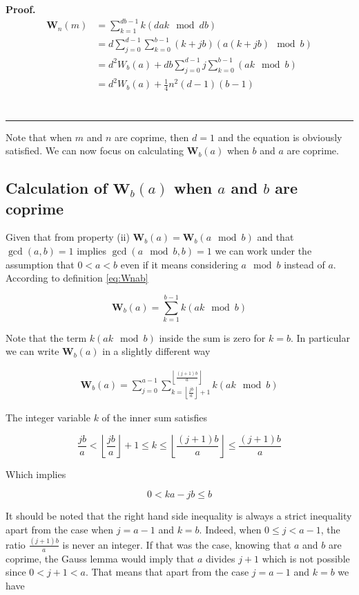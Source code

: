 \documentclass{article}%
\newenvironment{proof}[1][Proof]{\textbf{#1.} }{\ \rule{0.5em}{0.5em}}
\newcommand{\ENT}[1]{ \left\lfloor #1 \right\rfloor}
\newcommand{\Efrac}[2]{\ENT{\frac{#1}{#2}}}
\newcommand{\SUMW}[2]{\mathbf{W}_{#1}\left(#2\right)}
\begin{document}
\begin{proof}
\begin{align*}
\SUMW{n}{m}
&= \sum_{k=1}^{db-1}k(dak \mod db) \\
&= d \sum_{j=0}^{d-1} \sum_{k=0}^{b-1}(k+jb)(a(k+jb) \mod b) \\
&= d^2 W_{b}(a) + db \sum_{j=0}^{d-1} j\sum_{k=0}^{b-1}(ak \mod b) \\
&= d^2 W_{b}(a) + \frac{1}{4}n^2(d-1)(b-1) \\
\end{align*}
\end{proof}

Note that when $m$ and $n$ are coprime, then $d=1$ and the equation is obviously satisfied. We can now focus on calculating $\SUMW{b}{a}$ when $b$ and $a$ are coprime.

\subsection{Calculation of $\SUMW{b}{a}$ when $a$ and $b$ are coprime}

Given that from property (ii) $\SUMW{b}{a}=\SUMW{b}{a\mod b}$ and that $\gcd(a,b)=1$ implies $\gcd(a\mod b,b)=1$ we can work under the assumption that $0<a<b$ even if it means considering $a\mod b$ instead of $a$. According to definition \ref{eq:Wnab}

\begin{equation*}
\SUMW{b}{a} = \sum_{k=1}^{b-1}k(ak \mod b)
\end{equation*}

Note that the term $k(ak \mod b)$ inside the sum is zero for $k=b$. In particular we can write $\SUMW{b}{a}$ in a slightly different way

\begin{align*}
\SUMW{b}{a} = \sum_{j=0}^{a-1}\sum_{k=\Efrac{jb}{a}+1}^{\Efrac{(j+1)b}{a}}k(ak \mod b) 
\end{align*}

The integer variable $k$ of the inner sum satisfies

\begin{equation*}
\frac{jb}{a} < \Efrac{jb}{a}+1 \leq k \leq \Efrac{(j+1)b}{a} \leq \frac{(j+1)b}{a}
\end{equation*}

Which implies

\begin{equation*}
0 < ka-jb \leq b
\end{equation*}

It should be noted that the right hand side inequality is always a strict inequality apart from the case when $j=a-1$ and $k=b$. Indeed, when $0\leq j<a-1$, the ratio $\frac{(j+1)b}{a}$ is never an integer. If that was the case, knowing that $a$ and $b$ are coprime, the Gauss lemma would imply that $a$ divides $j+1$ which is not possible since $0< j+1 < a$. That means that apart from the case $j=a-1$ and $k=b$ we have
\end{document}
